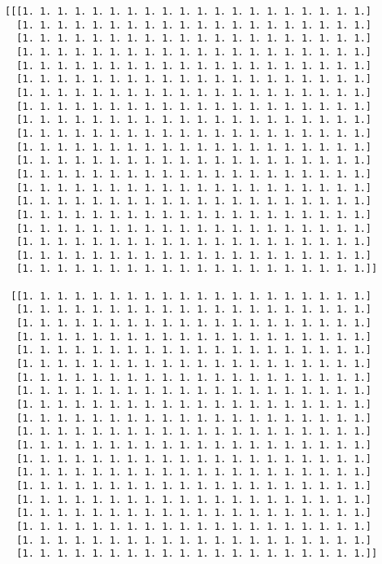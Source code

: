 \documentclass[11pt]{article}
\begin{document}
    \begin{Verbatim}[commandchars=\\\{\}]
[[[1. 1. 1. 1. 1. 1. 1. 1. 1. 1. 1. 1. 1. 1. 1. 1. 1. 1. 1. 1.]
  [1. 1. 1. 1. 1. 1. 1. 1. 1. 1. 1. 1. 1. 1. 1. 1. 1. 1. 1. 1.]
  [1. 1. 1. 1. 1. 1. 1. 1. 1. 1. 1. 1. 1. 1. 1. 1. 1. 1. 1. 1.]
  [1. 1. 1. 1. 1. 1. 1. 1. 1. 1. 1. 1. 1. 1. 1. 1. 1. 1. 1. 1.]
  [1. 1. 1. 1. 1. 1. 1. 1. 1. 1. 1. 1. 1. 1. 1. 1. 1. 1. 1. 1.]
  [1. 1. 1. 1. 1. 1. 1. 1. 1. 1. 1. 1. 1. 1. 1. 1. 1. 1. 1. 1.]
  [1. 1. 1. 1. 1. 1. 1. 1. 1. 1. 1. 1. 1. 1. 1. 1. 1. 1. 1. 1.]
  [1. 1. 1. 1. 1. 1. 1. 1. 1. 1. 1. 1. 1. 1. 1. 1. 1. 1. 1. 1.]
  [1. 1. 1. 1. 1. 1. 1. 1. 1. 1. 1. 1. 1. 1. 1. 1. 1. 1. 1. 1.]
  [1. 1. 1. 1. 1. 1. 1. 1. 1. 1. 1. 1. 1. 1. 1. 1. 1. 1. 1. 1.]
  [1. 1. 1. 1. 1. 1. 1. 1. 1. 1. 1. 1. 1. 1. 1. 1. 1. 1. 1. 1.]
  [1. 1. 1. 1. 1. 1. 1. 1. 1. 1. 1. 1. 1. 1. 1. 1. 1. 1. 1. 1.]
  [1. 1. 1. 1. 1. 1. 1. 1. 1. 1. 1. 1. 1. 1. 1. 1. 1. 1. 1. 1.]
  [1. 1. 1. 1. 1. 1. 1. 1. 1. 1. 1. 1. 1. 1. 1. 1. 1. 1. 1. 1.]
  [1. 1. 1. 1. 1. 1. 1. 1. 1. 1. 1. 1. 1. 1. 1. 1. 1. 1. 1. 1.]
  [1. 1. 1. 1. 1. 1. 1. 1. 1. 1. 1. 1. 1. 1. 1. 1. 1. 1. 1. 1.]
  [1. 1. 1. 1. 1. 1. 1. 1. 1. 1. 1. 1. 1. 1. 1. 1. 1. 1. 1. 1.]
  [1. 1. 1. 1. 1. 1. 1. 1. 1. 1. 1. 1. 1. 1. 1. 1. 1. 1. 1. 1.]
  [1. 1. 1. 1. 1. 1. 1. 1. 1. 1. 1. 1. 1. 1. 1. 1. 1. 1. 1. 1.]
  [1. 1. 1. 1. 1. 1. 1. 1. 1. 1. 1. 1. 1. 1. 1. 1. 1. 1. 1. 1.]]

 [[1. 1. 1. 1. 1. 1. 1. 1. 1. 1. 1. 1. 1. 1. 1. 1. 1. 1. 1. 1.]
  [1. 1. 1. 1. 1. 1. 1. 1. 1. 1. 1. 1. 1. 1. 1. 1. 1. 1. 1. 1.]
  [1. 1. 1. 1. 1. 1. 1. 1. 1. 1. 1. 1. 1. 1. 1. 1. 1. 1. 1. 1.]
  [1. 1. 1. 1. 1. 1. 1. 1. 1. 1. 1. 1. 1. 1. 1. 1. 1. 1. 1. 1.]
  [1. 1. 1. 1. 1. 1. 1. 1. 1. 1. 1. 1. 1. 1. 1. 1. 1. 1. 1. 1.]
  [1. 1. 1. 1. 1. 1. 1. 1. 1. 1. 1. 1. 1. 1. 1. 1. 1. 1. 1. 1.]
  [1. 1. 1. 1. 1. 1. 1. 1. 1. 1. 1. 1. 1. 1. 1. 1. 1. 1. 1. 1.]
  [1. 1. 1. 1. 1. 1. 1. 1. 1. 1. 1. 1. 1. 1. 1. 1. 1. 1. 1. 1.]
  [1. 1. 1. 1. 1. 1. 1. 1. 1. 1. 1. 1. 1. 1. 1. 1. 1. 1. 1. 1.]
  [1. 1. 1. 1. 1. 1. 1. 1. 1. 1. 1. 1. 1. 1. 1. 1. 1. 1. 1. 1.]
  [1. 1. 1. 1. 1. 1. 1. 1. 1. 1. 1. 1. 1. 1. 1. 1. 1. 1. 1. 1.]
  [1. 1. 1. 1. 1. 1. 1. 1. 1. 1. 1. 1. 1. 1. 1. 1. 1. 1. 1. 1.]
  [1. 1. 1. 1. 1. 1. 1. 1. 1. 1. 1. 1. 1. 1. 1. 1. 1. 1. 1. 1.]
  [1. 1. 1. 1. 1. 1. 1. 1. 1. 1. 1. 1. 1. 1. 1. 1. 1. 1. 1. 1.]
  [1. 1. 1. 1. 1. 1. 1. 1. 1. 1. 1. 1. 1. 1. 1. 1. 1. 1. 1. 1.]
  [1. 1. 1. 1. 1. 1. 1. 1. 1. 1. 1. 1. 1. 1. 1. 1. 1. 1. 1. 1.]
  [1. 1. 1. 1. 1. 1. 1. 1. 1. 1. 1. 1. 1. 1. 1. 1. 1. 1. 1. 1.]
  [1. 1. 1. 1. 1. 1. 1. 1. 1. 1. 1. 1. 1. 1. 1. 1. 1. 1. 1. 1.]
  [1. 1. 1. 1. 1. 1. 1. 1. 1. 1. 1. 1. 1. 1. 1. 1. 1. 1. 1. 1.]
  [1. 1. 1. 1. 1. 1. 1. 1. 1. 1. 1. 1. 1. 1. 1. 1. 1. 1. 1. 1.]]


\end{Verbatim}
\end{document}
